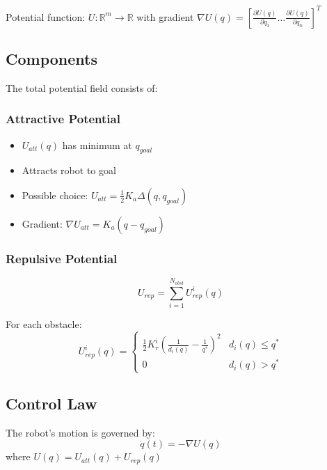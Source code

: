 \documentclass[openany]{book}
\theoremstyle{definition}
\theoremstyle{remark}
\newcommand{\definitionbox}[1]{
\begin{tcolorbox}[colback=blue!5,colframe=blue!40!black,title=Definition]
 #1
\end{tcolorbox}
}
\begin{document}
\definitionbox{
Potential function: $U: \mathbb{R}^m \rightarrow \mathbb{R}$ with gradient
$\nabla U(q) = \left[\frac{\partial U(q)}{\partial q_1} \ldots \frac{\partial U(q)}{\partial q_n}\right]^T$
}

\subsection{Components}
The total potential field consists of:

\subsubsection{Attractive Potential}
\begin{itemize}
    \item $U_{att}(q)$ has minimum at $q_{goal}$
    \item Attracts robot to goal
    \item Possible choice: $U_{att} = \frac{1}{2}K_a\Delta(q,q_{goal})$
    \item Gradient: $\nabla U_{att} = K_a(q - q_{goal})$
\end{itemize}

\subsubsection{Repulsive Potential}
\begin{equation}
U_{rep} = \sum_{i=1}^{N_{obst}} U_{rep}^i(q)
\end{equation}

For each obstacle:
\begin{equation}
U_{rep}^i(q) = 
\begin{cases}
\frac{1}{2}K_r^i(\frac{1}{d_i(q)} - \frac{1}{q^*})^2 & d_i(q) \leq q^* \\
0 & d_i(q) > q^*
\end{cases}
\end{equation}

\subsection{Control Law}
The robot's motion is governed by:
\begin{equation}
\dot{q}(t) = -\nabla U(q)
\end{equation}
where $U(q) = U_{att}(q) + U_{rep}(q)$
\end{document}
